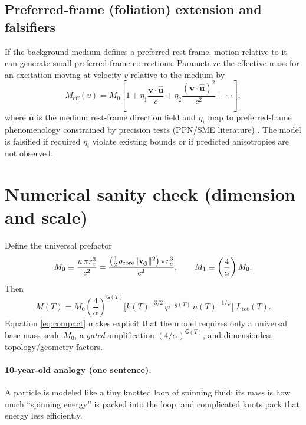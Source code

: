 \documentclass[11pt]{article}
\newcommand{\vnorm}{\lVert \mathbf{v}_{\mkern-2mu\scriptscriptstyle\boldsymbol{\circlearrowleft}} \rVert}  %
\newcommand{\rc}{r_c}                                    %
\newcommand{\phig}{\varphi}
\newcommand{\alphafs}{\alpha}
\newcommand{\rhocore}{\rho_{\mathrm{core}}}
\newcommand{\Gate}{\mathsf{G}}                 %
\theoremstyle{definition}
\theoremstyle{plain}
\theoremstyle{remark}
\begin{document}
        \subsection{Preferred-frame (foliation) extension and falsifiers}
            If the background medium defines a preferred rest frame, motion relative to it can generate small preferred-frame corrections. Parametrize the effective mass for an excitation moving at velocity $v$ relative to the medium by
            \begin{equation}
                M_{\mathrm{eff}}(v)=M_0\left[1+\eta_1\frac{\mathbf{v}\cdot\hat{\mathbf{u}}}{c}
                                           +\eta_2\frac{(\mathbf{v}\cdot\hat{\mathbf{u}})^2}{c^2}+\cdots\right],
                \label{eq:pf}
            \end{equation}
            where $\hat{\mathbf{u}}$ is the medium rest-frame direction field and $\eta_i$ map to preferred-frame phenomenology constrained by precision tests (PPN/SME literature) \cite{Will2014,Kostelecky2004}. The model is falsified if required $\eta_i$ violate existing bounds or if predicted anisotropies are not observed.

        \section{Numerical sanity check (dimension and scale)}
        Define the universal prefactor
        \begin{equation}
            M_0 \equiv \frac{u\,\pi \rc^{3}}{c^{2}}
            =\frac{\left(\frac12\rhocore \vnorm^2\right)\pi \rc^3}{c^2},
            \qquad
            M_1 \equiv \left(\frac{4}{\alphafs}\right) M_0.
            \label{eq:M0}
        \end{equation}
        Then
        \begin{equation}
            M(T)= M_0 \left(\frac{4}{\alphafs}\right)^{\Gate(T)} \Big[k(T)^{-3/2}\,\phig^{-g(T)}\,n(T)^{-1/\phig}\Big]\;L_{\mathrm{tot}}(T).
            \label{eq:compact}
        \end{equation}
        Equation \eqref{eq:compact} makes explicit that the model requires only a universal base mass scale \(M_0\), a \emph{gated} amplification \((4/\alpha)^{\Gate(T)}\), and dimensionless topology/geometry factors.

        \paragraph{10-year-old analogy (one sentence).}
            A particle is modeled like a tiny knotted loop of spinning fluid: its mass is how much ``spinning energy'' is packed into the loop, and complicated knots pack that energy less efficiently.
\end{document}

